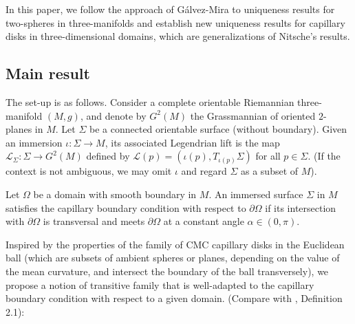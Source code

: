 \documentclass[11pt,reqno]{amsart}
\begin{document}

In this paper, we follow the approach of Gálvez-Mira to uniqueness results for two-spheres in three-manifolds and establish new uniqueness results for capillary disks in three-dimensional domains, which are generalizations of Nitsche's results.

\subsection{Main result} The set-up is as follows. Consider a complete orientable Riemannian three-manifold $(M,g)$, and denote by $G^2(M)$ the Grassmannian of oriented $2$-planes in $M$. Let $\Sigma$ be a connected orientable surface (without boundary). Given an immersion $\iota : \Sigma \rightarrow M$, its associated Legendrian lift is the map $\mathcal{L}_\Sigma:\Sigma\rightarrow G^2(M)$ defined by $\mathcal{L}(p)=(\iota(p),T_{\iota(p)}\Sigma)$ for all $p\in \Sigma$. (If the context is not ambiguous, we may omit $\iota$ and regard $\Sigma$ as a subset of $M$).

Let $\Omega$ be a domain with smooth boundary in $M$. An immersed surface $\Sigma$ in $M$ satisfies the capillary boundary condition with respect to $\partial \Omega$ if its intersection with $\partial\Omega$ is transversal and meets $\partial\Omega$ at a constant angle $\alpha\in (0,\pi)$. 

Inspired by the properties of the family of CMC capillary disks in the Euclidean ball (which are subsets of ambient spheres or planes, depending on the value of the mean curvature, and intersect the boundary of the ball transversely), we propose a notion of transitive family that is well-adapted to the capillary boundary condition with respect to a given domain. (Compare with \cite{Galvez-Mira-Uniqueness}, Definition 2.1):
\end{document}

